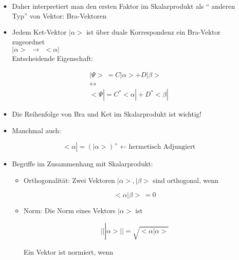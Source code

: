 \documentclass[10pt,article,colorback,accentcolor=tud9d]{scrartcl}
\begin{document}
\begin{itemize}
\begin{fleqn}
\begin{itemize}
\end{itemize}
\end{fleqn}
\item Daher interpretiert man den ersten Faktor im Skalarprodukt als "`
anderen Typ"' von Vektor: Bra-Vektoren
\item Jedem Ket-Vektor $\left|\right.\alpha>$ ist über duale Korrespondenz 
ein Bra-Vektor zugeordnet\\
$\left|\right.\alpha> \ \ \rightarrow \ \ <\alpha\left|\right.$\\
Entscheidende Eigenschaft:
\begin{fleqn}
\begin{equation}
\begin{aligned}
\left|\right.\Psi> \ = C \left|\right.\alpha> +D\left|\right.\beta>\\
\longleftrightarrow\\
<\Psi\left|\right.=C^*<\alpha\left|\right. +D^* <\beta\left|\right.
\end{aligned}
\end{equation}
\end{fleqn}
\item Die Reihenfolge von Bra und Ket im Skalarprodukt ist wichtig!
\item Manchmal auch:
\begin{fleqn}
\begin{equation}
<\alpha\left|\right.=(\left|\right.\alpha>)^+ \leftarrow \text{hermetisch 
Adjungiert}
\end{equation}
\end{fleqn}
\item Begriffe im Zusammenhang mit Skalarprodukt:
\begin{itemize}
\item Orthogonalität: Zwei Vektoren $\left|\right.\alpha>, \left|\right.\beta>
$ sind orthogonal, wenn
\begin{fleqn}
\begin{equation}
<\alpha\left|\right.\beta> \ =0
\end{equation}
\end{fleqn}
\item Norm: Die Norm eines Vektors $\left|\right.\alpha>$ ist 
\begin{fleqn}
\begin{equation}
\left|\right|\left|\right.\alpha>\left|\right|=\sqrt{<\alpha\left|\right.
\alpha>}
\end{equation}
\end{fleqn}
Ein Vektor ist normiert, wenn
\begin{fleqn}

\end{fleqn}
\end{itemize}
\end{itemize}
\end{document}
